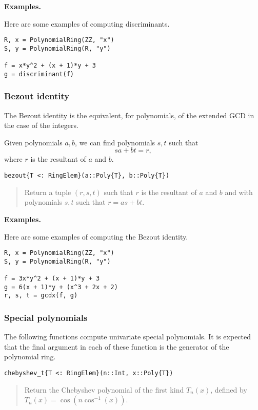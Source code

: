\documentclass[a4paper,10pt]{article}
\newcommand{\desc}[1]{\vspace{-3mm}\begin{quote}#1\end{quote}}
\begin{document}
\textbf{Examples.}

Here are some examples of computing discriminants.

\begin{lstlisting}
R, x = PolynomialRing(ZZ, "x")
S, y = PolynomialRing(R, "y")

f = x*y^2 + (x + 1)*y + 3
g = discriminant(f)
\end{lstlisting}

\subsubsection{Bezout identity}

The Bezout identity is the equivalent, for polynomials, of the extended GCD
in the case of the integers.

Given polynomials $a, b$, we can find polynomials $s, t$ such that
$$sa + bt = r,$$
where $r$ is the resultant of $a$ and $b$.

\begin{lstlisting}
bezout{T <: RingElem}(a::Poly{T}, b::Poly{T})
\end{lstlisting}

\desc{Return a tuple $(r, s, t)$ such that $r$ is the resultant of $a$ and $b$
and with polynomials $s, t$ such that $r = as + bt$.}

\textbf{Examples.}

Here are some examples of computing the Bezout identity.

\begin{lstlisting}
R, x = PolynomialRing(ZZ, "x")
S, y = PolynomialRing(R, "y")

f = 3x*y^2 + (x + 1)*y + 3
g = 6(x + 1)*y + (x^3 + 2x + 2)
r, s, t = gcdx(f, g)
\end{lstlisting}

\subsubsection{Special polynomials}

The following functions compute univariate special polynomials. It is expected
that the final argument in each of these function is the generator of the polynomial ring.

\begin{lstlisting}
chebyshev_t{T <: RingElem}(n::Int, x::Poly{T})
\end{lstlisting}

\desc{Return the Chebyshev polynomial of the first kind $T_n(x)$, defined by 
$T_n(x) = \cos(n \cos^{-1}(x))$.}
\end{document}
